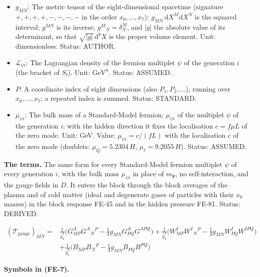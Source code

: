 \documentclass[
  10pt,
]{article}
\begin{document}
\begin{itemize}
\item
  \(g_{MN}\): The metric tensor of the eight-dimensional spacetime
  (signature \(+,+,+,+,-,-,-,-\) in the order \(x_0, \dots, x_7\)):
  \(g_{MN}\,\mathrm{d}X^M\mathrm{d}X^N\) is the squared interval;
  \(g^{MN}\) is its inverse, \(g^M{}_N = \delta^M_N\), and
  \(\lvert g\rvert\) the absolute value of its determinant, so that
  \(\sqrt{\lvert g\rvert}\,\mathrm{d}^8X\) is the proper volume element.
  Unit: dimensionless. Status: AUTHOR.
\item
  \(\mathcal{L}_{\psi i}\): The Lagrangian density of the fermion
  multiplet \(\psi\) of the generation \(i\) (the bracket of
  \(S_{\mathrm{f}}\)). Unit: \(\mathrm{GeV}^{8}\). Status: ASSUMED.
\item
  \(P\): A coordinate index of eight dimensions (also
  \(P_1, P_2, \dots\)), running over \(x_0, \dots, x_7\); a repeated
  index is summed. Status: STANDARD.
\item
  \(\mu_{\psi i}\): The bulk mass of a Standard-Model fermion:
  \(\mu_{\psi i}\) of the multiplet \(\psi\) of the generation \(i\);
  with the hidden direction it fixes the localisation \(c = f\mu L\) of
  the zero mode. Unit: GeV. Value: \(\mu_{\psi i} = c/(fL)\) with the
  localisation \(c\) of the zero mode (doublets: \(\mu_Q = 5.2304\,H\),
  \(\mu_\ell = 9.2055\,H\)). Status: ASSUMED.
\end{itemize}

\textbf{The terms.} The same form for every Standard-Model fermion
multiplet \(\psi\) of every generation \(i\), with the bulk mass
\(\mu_{\psi i}\) in place of \(m_\Psi\), no self-interaction, and the
gauge fields in \(D\). It enters the block through the block averages of
the plasma and of cold matter (ideal and degenerate gases of particles
with their \(x_0\) masses) in the block response FE-45 and in the hidden
pressure FE-81. Status: DERIVED.

\[
\begin{aligned}
(\mathcal{T}_{\mathrm{gauge}})_{MN} ={}& \frac{1}{\hat g_3^2}\Big(G^A_{MP}G^A{}_N{}^P -
 \frac14g_{MN}G^A_{PQ}G^{APQ}\Big)
 + \frac{1}{\hat g_2^2}\Big(W^I_{MP}W^I{}_N{}^P - \frac14g_{MN}W^I_{PQ}W^{IPQ}\Big)\\
&+ \frac{1}{\hat g_1^2}\Big(B_{MP}B_N{}^P - \frac14g_{MN}B_{PQ}B^{PQ}\Big)
\end{aligned} \tag{FE-7}
\]

\textbf{Symbols in (FE-7).}
\end{document}
